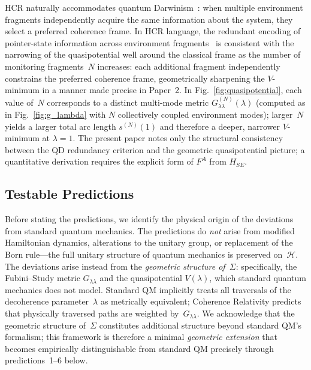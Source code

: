 \documentclass[aps,prd,twocolumn,superscriptaddress,nofootinbib,floatfix]{revtex4-2}
\newcommand{\Sig}{\Sigma}
\newcommand{\Gll}{G_{\lambda\lambda}}
\newcommand{\HCR}{HCR}
\newcommand{\CR}{\HCR}  %
\begin{document}
\CR{} naturally accommodates quantum Darwinism~\cite{zurekQuantumDarwinism2009}: when multiple environment fragments independently acquire the same information about the system, they select a preferred coherence frame. In \CR{} language, the redundant encoding of pointer-state information across environment fragments~\cite{riedelObjectiveQuantumUniverse2016,korbiczObjectivityNoisyPhotonic2017} is consistent with the narrowing of the quasipotential well around the classical frame as the number of monitoring fragments~$N$ increases: each additional fragment independently constrains the preferred coherence frame, geometrically sharpening the $V$-minimum in a manner made precise in Paper~2. In Fig.~\ref{fig:quasipotential}, each value of~$N$ corresponds to a distinct multi-mode metric $\Gll^{(N)}(\lambda)$ (computed as in Fig.~\ref{fig:g_lambda} with $N$ collectively coupled environment modes); larger~$N$ yields a larger total arc length $s^{(N)}(1)$ and therefore a deeper, narrower $V$-minimum at $\lambda = 1$. The present paper notes only the structural consistency between the QD redundancy criterion and the geometric quasipotential picture; a quantitative derivation requires the explicit form of $F^A$ from $H_{SE}$.

\subsection{Testable Predictions}\label{sec:predictions}

Before stating the predictions, we identify the physical origin of the deviations from standard quantum mechanics. The predictions do \emph{not} arise from modified Hamiltonian dynamics, alterations to the unitary group, or replacement of the Born rule---the full unitary structure of quantum mechanics is preserved on~$\mathcal{H}$. The deviations arise instead from the \emph{geometric structure of~$\Sig$}: specifically, the Fubini--Study metric $\Gll$ and the quasipotential $V(\lambda)$, which standard quantum mechanics does not model. Standard QM implicitly treats all traversals of the decoherence parameter~$\lambda$ as metrically equivalent; Coherence Relativity predicts that physically traversed paths are weighted by~$\Gll$. We acknowledge that the geometric structure of~$\Sig$ constitutes additional structure beyond standard QM's formalism; this framework is therefore a minimal \emph{geometric extension} that becomes empirically distinguishable from standard QM precisely through predictions~1--6 below.
\end{document}
